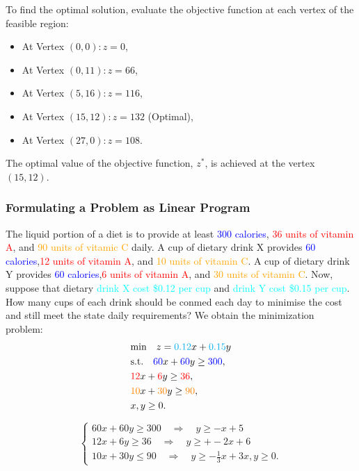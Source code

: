 \documentclass[unicode,11pt,a4paper,oneside,numbers=endperiod,openany]{scrartcl}
\begin{document}
To find the optimal solution, evaluate the objective function at each vertex of the feasible region:

\begin{itemize}
    \item At Vertex $(0,0): z=0$,
    \item At Vertex $(0,11): z=66$,
    \item At Vertex $(5,16): z=116$,
    \item At Vertex $(15,12): z=132$ (Optimal),
    \item At Vertex $(27,0): z=108$.
\end{itemize}

The optimal value of the objective function, $z^*$, is achieved at the vertex $(15,12)$.
\subsubsection{Formulating a Problem as Linear Program}
The liquid portion of a diet is to provide at least \textcolor{blue}{300 calories}, \textcolor{red}{36 units of vitamin A}, and \textcolor{orange}{90 units of vitamic C} daily. A cup of dietary drink X provides \textcolor{blue}{60 calories},\textcolor{red}{12 units of vitamin A}, and \textcolor{orange}{10 units of vitamin C}. A cup of dietary drink Y provides \textcolor{blue}{60 calories},\textcolor{red}{6 units of vitamin A}, and \textcolor{orange}{30 units of vitamin C}. Now, suppose that dietary \textcolor{cyan}{drink X cost \$0.12 per cup} and \textcolor{cyan}{drink Y cost \$0.15 per cup}. How many cups of each drink should be conmed each day to minimise the cost and still meet the state daily requirements?
\newline
We obtain the minimization problem:\
\[
 \begin{aligned}
 &\text{min} \quad z = \textcolor{cyan}{0.12}x + \textcolor{cyan}{0.15}y \\
 &\text{s.t.} \quad \textcolor{blue}{60}x + \textcolor{blue}{60}y \geq \textcolor{blue}{300}, \\
 &\textcolor{red}{12}x +\textcolor{red}{6} y \geq \textcolor{red}{36}, \\
 &\textcolor{orange}{10}x + \textcolor{orange}{30}y \geq \textcolor{orange}{90}, \\
 &x, y \geq 0.
 \end{aligned}
\]

\[
 \begin{cases}
  60x +60y \geq 300 \quad \Rightarrow \quad y \geq -x+5 \\
  12x +6y \geq36 \quad \Rightarrow \quad y \geq + -2x+6\\
  10x+30y \leq 90 \quad \Rightarrow \quad y \geq -\frac{1}{3}x+3
  x, y \geq 0.
 \end{cases}
\]
\end{document}
